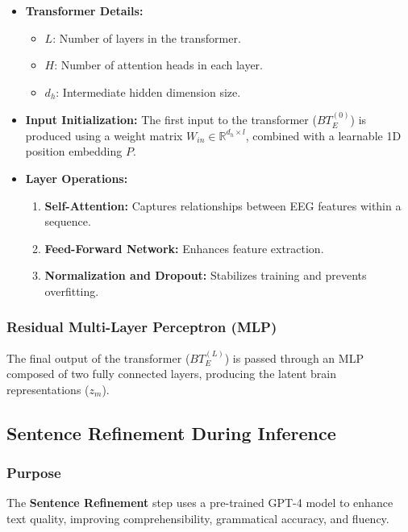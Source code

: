\documentclass[journal]{IEEEtran}
\begin{document}
\begin{itemize}
	\item \textbf{Transformer Details:}
	      \begin{itemize}
	      	\item \( L \): Number of layers in the transformer.
	      	\item \( H \): Number of attention heads in each layer.
	      	\item \( d_h \): Intermediate hidden dimension size.
	      \end{itemize}
	\item \textbf{Input Initialization:} The first input to the transformer (\( BT_E^{(0)} \)) is produced using a weight matrix \( W_{in} \in \mathbb{R}^{d_h \times l} \), combined with a learnable 1D position embedding \( P \).
	\item \textbf{Layer Operations:}
	      \begin{enumerate}
	      	\item \textbf{Self-Attention:} Captures relationships between EEG features within a sequence.
	      	\item \textbf{Feed-Forward Network:} Enhances feature extraction.
	      	\item \textbf{Normalization and Dropout:} Stabilizes training and prevents overfitting.
	      \end{enumerate}
\end{itemize}

\subsubsection{Residual Multi-Layer Perceptron (MLP)}
The final output of the transformer (\( BT_E^{(L)} \)) is passed through an MLP composed of two fully connected layers, producing the latent brain representations (\( z_m \)).

\subsection{Sentence Refinement During Inference}
    
\subsubsection{Purpose}
The \textbf{Sentence Refinement} step uses a pre-trained GPT-4 model to enhance text quality, improving comprehensibility, grammatical accuracy, and fluency.
\end{document}

